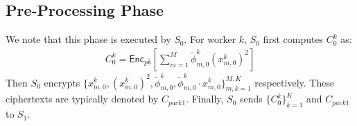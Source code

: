 \documentclass[conference]{IEEEtran}
\begin{document}
\subsection{Pre-Processing Phase}
We note that this phase is executed by $S_0$.
For worker $k$, $S_0$ first computes $C_0^k$ as: 
\begin{equation}
  \begin{split}
  C_0^k = \mathsf{Enc}_{pk}\left[\sum_{m=1}^M \tilde{\phi}_{m,0}^k \left(x_{m,0}^k\right)^2\right]
  \end{split}
\end{equation}
Then $S_0$ encrypts $\{x_{m,0}^k, (x_{m,0}^k)^2, \tilde{\phi}_{m,0}^k,\tilde{\phi}_{m,0}^k\cdot x_{m,0}^k\}_{m,k=1}^{M,K}$ respectively.
These ciphertexts are typically denoted by $C_{pack1}$.
Finally, $S_0$ sends $\{C_0^k\}_{k=1}^K$ and $C_{pack1}$ to $S_1$.
\end{document}
